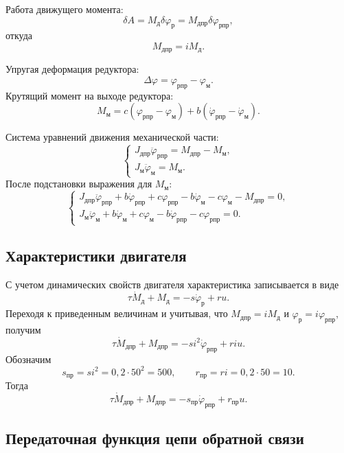 \documentclass[a4paper, 14pt]{extarticle}
\begin{document}
Работа движущего момента:
\[
	\delta A=M_\text{д}\delta\varphi_\text{р}=M_{\text{дпр}}\delta\varphi_{\text{рпр}},
\]
откуда
\[
	M_{\text{дпр}}=iM_\text{д}.
\]

Упругая деформация редуктора:
\[
	\Delta\varphi=\varphi_{\text{рпр}}-\varphi_\text{м}.
\]
Крутящий момент на выходе редуктора:
\[
	M_\text{м}=c(\varphi_{\text{рпр}}-\varphi_\text{м})+
	b(\dot\varphi_{\text{рпр}}-\dot\varphi_\text{м}).
\]

Система уравнений движения механической части:
\[
	\begin{cases}
		J_{\text{дпр}}\ddot\varphi_{\text{рпр}}=M_{\text{дпр}}-M_\text{м}, \\
		J_\text{м}\ddot\varphi_\text{м}=M_\text{м}.
	\end{cases}
\]
После подстановки выражения для $M_\text{м}$:
\[
	\begin{cases}
		J_{\text{дпр}}\ddot\varphi_{\text{рпр}}+b\dot\varphi_{\text{рпр}}+c\varphi_{\text{рпр}}
		-b\dot\varphi_\text{м}-c\varphi_\text{м}-M_{\text{дпр}}=0, \\
		J_\text{м}\ddot\varphi_\text{м}+b\dot\varphi_\text{м}+c\varphi_\text{м}
		-b\dot\varphi_{\text{рпр}}-c\varphi_{\text{рпр}}=0.
	\end{cases}
\]

\subsection{Характеристики двигателя}

С учетом динамических свойств двигателя характеристика записывается в виде
\[
	\tau \dot M_\text{д}+M_\text{д}=-s\dot\varphi_\text{р}+ru.
\]
Переходя к приведенным величинам и учитывая, что $M_{\text{дпр}}=iM_\text{д}$ и $\varphi_\text{р}=i\varphi_{\text{рпр}}$, получим
\[
	\tau \dot M_{\text{дпр}}+M_{\text{дпр}}=-si^2\dot\varphi_{\text{рпр}}+riu.
\]
Обозначим
\[
	s_{\text{пр}}=si^2=0{,}2\cdot50^2=500,\qquad
	r_{\text{пр}}=ri=0{,}2\cdot50=10.
\]
Тогда
\[
	\tau \dot M_{\text{дпр}}+M_{\text{дпр}}=-s_{\text{пр}}\dot\varphi_{\text{рпр}}+r_{\text{пр}}u.
\]

\subsection{Передаточная функция цепи обратной связи}


\end{document}
